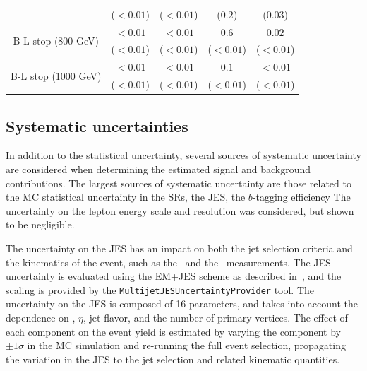 \begin{table}
{\begin{tabular}{c|cccc}
                                             & ($< 0.01$)                         & ($<0.01$)                          & ($0.2$)                          & ($0.03$) \vspace{1ex} \\
      \multirow{2}{*}{B-L stop (800 GeV)}    & $< 0.01$                           & $< 0.01$                           & $0.6$                            & $0.02$   \\
                                             & ($< 0.01$)                         & ($< 0.01$)                         & ($< 0.01$)                       & ($< 0.01$) \vspace{1ex} \\
      \multirow{2}{*}{B-L stop (1000 GeV)}   & $< 0.01$                           & $< 0.01$                           & $0.1$                            & $< 0.01$                     \\
                                             & ($< 0.01$)                         & ($< 0.01$)                         & ($< 0.01$)                       & ($< 0.01$)
      \vspace{1ex} \\
      \bottomrule
    \end{tabular}

  }
\end{table}

\subsection{Systematic uncertainties}
\label{sec:systematics}

In addition to the statistical uncertainty, several sources of systematic
uncertainty are considered when determining the estimated signal and background
contributions.
The largest sources of systematic uncertainty are those related to the
MC statistical uncertainty in the SRs, the JES, the $b$-tagging efficiency
The uncertainty on the lepton energy scale and resolution was considered,
but shown to be negligible.

The uncertainty on the JES has an impact on both the jet selection criteria
and the kinematics of the event, such as the \HT\ and the \MET\ measurements.
The JES uncertainty is evaluated using the EM+JES scheme as described
in~\cite{JES}, and the scaling is provided by the
\texttt{MultijetJESUncertaintyProvider} tool.
The uncertainty on the JES is composed of 16 parameters, and takes into account
the dependence on \pt, $\eta$, jet flavor, and the number of primary vertices.
The effect of each component on the event yield is estimated by varying the
component by $\pm 1 \sigma$ in the MC simulation and re-running the full event
selection, propagating the variation in the JES to the jet selection and related
kinematic quantities.

